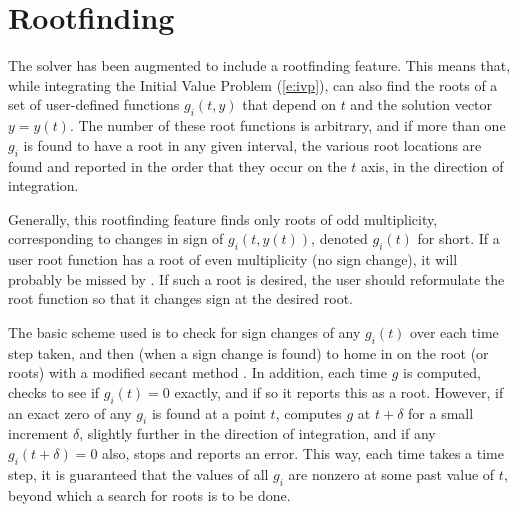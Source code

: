 \section{Rootfinding}\label{ss:rootfinding}

The {\cvode} solver has been augmented to include a rootfinding
feature.  This means that, while integrating the Initial Value Problem
(\ref{e:ivp}), {\cvode} can also find the roots of a set of user-defined
functions $g_i(t,y)$ that depend on $t$ and the solution vector 
$y = y(t)$.  The number of these root functions is arbitrary, and if
more than one $g_i$ is found to have a root in any given interval, the
various root locations are found and reported in the order that they
occur on the $t$ axis, in the direction of integration.

Generally, this rootfinding feature finds only roots of odd
multiplicity, corresponding to changes in sign of $g_i(t,y(t))$,
denoted $g_i(t)$ for short.  If a user root function has a root of
even multiplicity (no sign change), it will probably be missed by
{\cvode}.  If such a root is desired, the user should reformulate the
root function so that it changes sign at the desired root.

The basic scheme used is to check for sign changes of any $g_i(t)$ over
each time step taken, and then (when a sign change is found) to home
in on the root (or roots) with a modified secant method \cite{HeSh:80}.  
In addition, each time $g$ is computed, {\cvode} checks to see if 
$g_i(t) = 0$ exactly, and if so it reports this as a root.  However,
if an exact zero of any $g_i$ is found at a point $t$, {\cvode}
computes $g$ at $t + \delta$ for a small increment $\delta$, slightly
further in the direction of integration, and if any $g_i(t + \delta)=0$ 
also, {\cvode} stops and reports an error.  This way, each time
{\cvode} takes a time step, it is guaranteed that the values of all
$g_i$ are nonzero at some past value of $t$, beyond which a search for
roots is to be done.

